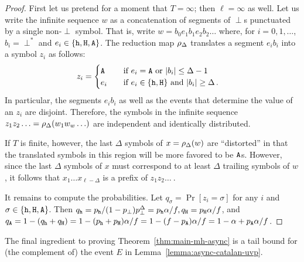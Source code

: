 \begin{proof}
  First let us pretend for a moment that $T = \infty$; 
  then $\ell = \infty$ as well. 
  Let us write the infinite sequence $w$ as a concatenation of segments 
  of $\perp$s punctuated by a single non-$\perp$ symbol. 
  That is, write $w = b_0 e_1 b_1 e_2 b_2 \ldots$ 
  where, for $i = 0, 1, \ldots$, $b_i = \perp^*$ and $e_i \in \{\mathtt{h}, \mathtt{H}, \mathtt{A}\}$. 
  The reduction map $\rho_\Delta$ translates a segment $e_i b_i$ into a symbol $z_i$ 
  as follows:
  \begin{align*}
    z_i &= \begin{cases}
      \mathtt{A} &\quad \text{if $e_i = \mathtt{A}$ or $|b_i| \leq \Delta - 1$}\, \\
      e_i &\quad \text{if $e_i \in \{\mathtt{h}, \mathtt{H}\}$ and $|b_i| \geq \Delta$}\,.
    \end{cases}
  \end{align*}
  In particular, the segments $e_i b_i$ as well as 
  the events that determine the value of an $z_i$ are disjoint. 
  Therefore, the symbols in the infinite sequence 
  $z_1 z_2 \ldots = \rho_\Delta(w_1 w_w \ldots)$ are 
  independent and identically distributed.

  If $T$ is finite, however, the last $\Delta$ symbols 
  of $x = \rho_\Delta(w)$ are ``distorted'' 
  in that the translated symbols in this region will be more favored to be $\mathtt{A}$s. 
  However, since the last $\Delta$ symbols of $x$ must correspond to 
  at least $\Delta$ trailing symbols of $w$, 
  it follows that $x_1 \ldots x_{\ell - \Delta}$ 
  is a prefix of $z_1 z_2 \ldots\ $. 

  It remains to compute the probabilities. 
  Let $q_\sigma = \Pr[z_i = \sigma]$ for any $i$ and $\sigma \in \{\mathtt{h}, \mathtt{H}, \mathtt{A}\}$. 
  Then 
  $
    q_{\mathtt{h}} = p_{\mathtt{h}}/(1 - p_\perp) p_\perp^{\Delta} = p_{\mathtt{h}} \alpha/f,
    q_{\mathtt{H}} = p_{\mathtt{H}} \alpha/f
  $, 
  and 
  $
  q_{\mathtt{A}} 
    = 1 - (q_{\mathtt{h}} + q_{\mathtt{H}}) 
    = 1 - (p_{\mathtt{h}} + p_{\mathtt{H}})\alpha/f 
    = 1 - (f - p_{\mathtt{A}})\alpha/f 
    = 1 - \alpha + p_{\mathtt{A}} \alpha/f
  $.
\end{proof}

The final ingredient to proving Theorem~\ref{thm:main-mh-async} 
is a tail bound for (the complement of) the event $E$ 
in Lemma~\ref{lemma:async-catalan-uvp}. 


